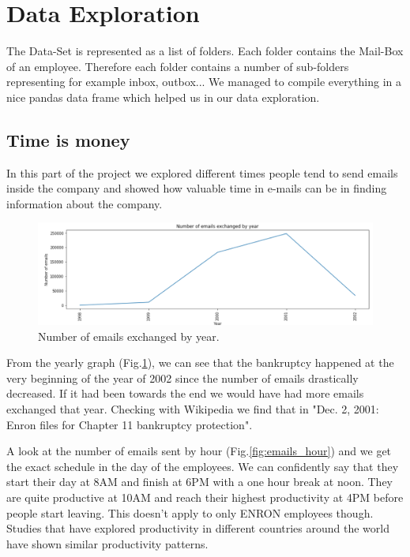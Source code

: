 \documentclass[11pt]{article}
\begin{document}
\section{Data Exploration}\label{Data Exploration}

The Data-Set is represented as a list of folders. Each folder contains the Mail-Box of an employee. Therefore each folder contains a number of sub-folders representing for example inbox, outbox... We managed to compile everything in a nice pandas data frame which helped us in our data exploration.
\subsection{Time is money}
In this part of the project we explored different times people tend to send emails inside the company and showed how valuable time in e-mails can be in finding information about the company.

\begin{figure}[htbp]
  \centering
  \includegraphics[width=\columnwidth]{images/emails_year.png}
  \vspace{-7mm}
  \caption{Number of emails exchanged by year.}
  \vspace{-3mm}
  \label{fig:emails_year}
\end{figure}

From the yearly graph (Fig.\ref{fig:emails_year}), we can see that the bankruptcy happened at the very beginning of the year of 2002 since the number of emails drastically decreased. If it had been towards the end we would have had more emails exchanged that year.
Checking with Wikipedia\cite{ENRON_Scandal} we find that in "Dec. 2, 2001: Enron files for Chapter 11 bankruptcy protection".

A look at the number of emails sent by hour (Fig.\ref{fig:emails_hour}) and we get the exact schedule in the day of the employees. We can confidently say that they start their day at 8AM and finish at 6PM with a one hour break at noon.
They are quite productive at 10AM and reach their highest productivity at 4PM before people start leaving. This doesn't apply to only ENRON employees though. Studies that have explored productivity in different countries around the world have shown similar productivity patterns\cite{pipedrive}. 
\end{document}
